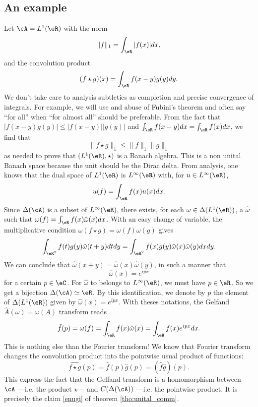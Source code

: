 \subsection{An example}

Let $\cA=L^1(\eR)$ with the norm
\[
  \|f\|_1=\int_{\eR}|f(x)|dx,
\]
and the convolution product
\[
   (f\star g)(x)=\int_{\eR}f(x-y)g(y)dy.
\]
We don't take care to analysis subtleties as completion and precise convergence of integrals. For example, we will use and abuse of Fubini's theorem and often say ``for all'' when ``for almost all'' should be preferable. From the fact that $|f(x-y)g(y)|\leq|f(x-y)||g(y)|$ and $\int_{\eR}f(x-y)dx=\int_{\eR}f(x)dx$, we find that 
\[
   \|f\star g\|_1\leq \|f\|_1\|g\|_1
\]
as needed to prove that $(L^1(\eR),\star)$ is a Banach algebra. This is a non unital Banach space because the unit should be the Dirac delta. From analysis, one knows that the dual space of $L^1(\eR)$ is $L^{\infty}(\eR)$ with, for $u\in L^{\infty}(\eR)$,
\[
  u(f)=\int_{\eR}f(x)u(x)dx.
\]
Since $\Delta(\cA)$ is a subset of $L^{\infty}(\eR)$, there exists, for each $\omega\in\Delta(L^1(\eR))$, a $\hat{\omega}$ such that $\omega(f)=\int_{\eR}f(x)\hat{\omega}(x)dx$. With an easy change of variable, the multiplicative condition $\omega(f\star g)=\omega(f)\omega(g)$ gives
\[ 
\int_{\eR^2}f(t)g(y)\hat{\omega}(t+y)dtdy=\int_{\eR^2}f(x)g(y)\hat{\omega}(x)\hat{\omega}(y)dxdy.
\]
We can conclude that $\hat{\omega}(x+y)=\hat{\omega}(x)\hat{\omega}(y)$, in such a manner that
\[ 
\hat{\omega}(x)=e^{ipx}
\]
for a certain $p\in\eC$. For $\hat{\omega}$ to belongs to $L^{\infty}(\eR)$, we must have $p\in\eR$. So we get a bijection $\Delta(\cA)\simeq\eR$. By this identification, we denote by $p$ the element of $\Delta(L^1(\eR))$ given by $\hat{\omega}(x)=e^{ipx}$. With theses notations, the Gelfand $\hat A(\omega)=\omega(A)$ transform reads
\begin{equation}
  \hat f(p)=\omega(f)=\int_{\eR}f(x)\hat{\omega}(x)
                     =\int_{\eR}f(x)e^{ipx}dx.
\end{equation}
This is nothing else than the Fourier transform! We know that Fourier transform changes the convolution product into the pointwise usual product of functions:
\[ 
\widehat{f\star g}(p)=\hat f(p)\hat g(p)=(\hat f\hat g)(p).
\]
This express the fact that the Gelfand transform is a homomorphism between $\cA$ ---i.e. the product $\star$--- and $C(\Delta(\cA))$ ---i.e. the pointwise product. It is precisely the claim \ref{enugi} of theorem  \ref{tho:unital_comm}. 


